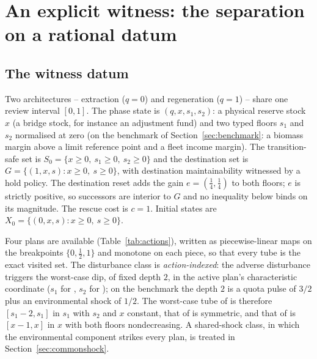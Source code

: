 \section{An explicit witness: the separation on a rational datum}\label{sec:witness}

\subsection{The witness datum}\label{sec:datum}

Two architectures -- extraction ($q=0$) and regeneration ($q=1$) -- share one review interval $[0,1]$. The phase state is $(q,x,s_1,s_2)$: a physical reserve stock $x$ (a bridge stock, for instance an adjustment fund) and two typed floors $s_1$ and $s_2$ normalised at zero (on the benchmark of Section~\ref{sec:benchmark}: a biomass margin above a limit reference point and a fleet income margin). The transition-safe set is $S_0=\{x\ge0,\ s_1\ge0,\ s_2\ge0\}$ and the destination set is $G=\{(1,x,s):x\ge0,\ s\ge0\}$, with destination maintainability witnessed by a hold policy. The destination reset adds the gain $e=(\tfrac14,\tfrac14)$ to both floors; $e$ is strictly positive, so successors are interior to $G$ and no inequality below binds on its magnitude. The rescue cost is $c=1$. Initial states are $X_0=\{(0,x,s):x\ge0,\ s\ge0\}$.

Four plans are available (Table~\ref{tab:actions}), written as piecewise-linear maps on the breakpoints $\{0,\tfrac12,1\}$ and monotone on each piece, so that every tube is the exact visited set. The disturbance class is \emph{action-indexed}: the adverse disturbance triggers the worst-case dip, of fixed depth $2$, in the active plan's characteristic coordinate ($s_1$ for , $s_2$ for ); on the benchmark the depth $2$ is a quota pulse of $3/2$ plus an environmental shock of $1/2$. The worst-case tube of  is therefore $[s_1-2,s_1]$ in $s_1$ with $s_2$ and $x$ constant, that of  is symmetric, and that of  is $[x-1,x]$ in $x$ with both floors nondecreasing. A shared-shock class, in which the environmental component strikes every plan, is treated in Section~\ref{sec:commonshock}.

